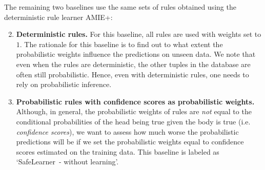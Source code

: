 \documentclass[akbc,twoside,11pt]{article}
\newcommand{\algorithmname}{SafeLearner\xspace}
\begin{document}
\noindent The remaining two baselines use the same sets of rules obtained using the deterministic rule learner AMIE+:

\begin{enumerate}
    \setcounter{enumi}{1}
    \item {\bf Deterministic rules.} For this baseline, all rules are used with weights set to $1$. The rationale for this baseline is to find out to what extent the probabilistic weights influence the predictions on unseen data. We note that even when the rules are deterministic, the other tuples in the database are often still probabilistic. Hence, even with deterministic rules, one needs to rely on probabilistic inference. %
    \item {\bf Probabilistic rules with confidence scores as probabilistic weights.} Although, in general, the probabilistic weights of rules are {\em not} equal to the conditional probabilities of the head being true given the body is true (i.e. {\em confidence scores}), we want to assess how much worse the probabilistic predictions will be if we set the probabilistic weights equal to confidence scores estimated on the training data. This baseline is labeled as `\algorithmname\ - without learning'.
\end{enumerate}




\end{document}
